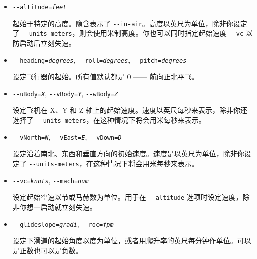 {\begin{itemize}
  起始于特定的经度和纬度，以十进制角度表示（西经和南纬用负数）。

\item{\texttt{-$ $-altitude={\it feet}}}

 起始于特定的高度。隐含表示了 \texttt{-$ $-in-air}。高度以英尺为单位，除非你设定了 \texttt{-$ $-units-meters}，则会使用米制高度。你也可以同时指定起始速度 \texttt{-$ $-vc} 以防启动后立刻失速。

\item{\texttt{-$ $-heading={\it degrees}}, \texttt{-$ $-roll={\it degrees}}, \texttt{-$ $-pitch={\it degrees}}}

设定飞行器的起始。所有值默认都是 0 —— 航向正北平飞。

\item{\texttt{-$ $-uBody={\it X}}, \texttt{-$ $-vBody={\it Y}}, \texttt{-$ $-wBody={\it Z}}}

设定飞机在 X、Y 和 Z 轴上的起始速度。速度以英尺每秒来表示，除非你还选择了 \texttt{-$ $-units-meters}，在这种情况下将会用米每秒来表示。

\item{\texttt{-$ $-vNorth={\it N}}, \texttt{-$ $-vEast={\it E}}, \texttt{-$ $-vDown={\it D}}}

设定沿着南北、东西和垂直方向的初始速度。速度是以英尺为单位，除非你设定了 \texttt{-$ $-units-meters}，在这种情况下将会用米每秒来表示。

\item{\texttt{-$ $-vc={\it knots}}, \texttt{-$ $-mach={\it num}}}

设定起始空速以节或马赫数为单位。用于在 \texttt{-$ $-altitude} 选项时设定速度，除非你想一启动就立刻失速。

\item{\texttt{-$ $-glideslope={\it gradi}}, \texttt{-$ $-roc={\it fpm}}}

设定下滑道的起始角度以度为单位，或者用爬升率的英尺每分钟作单位。可以是正数也可以是负数。

 \end{itemize}

}
\fi


